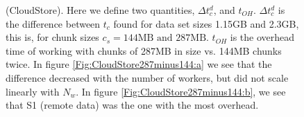 \documentclass{rspublic}
\begin{document}
\begin{figure}
\begin{center}
\caption{(CloudStore). Here
we define two quantities, $\Delta t_c^d$, and $t_{OH}$. $\Delta t_c^d$
is the difference between $t_c$ found for data set sizes 1.15GB and
2.3GB, this is, for chunk sizes $c_s = 144\mbox{MB and } 287\mbox{MB}$.
$t_{OH}$ is the overhead time of working with chunks of 287MB in size
vs. 144MB chunks twice. In figure \ref{Fig:CloudStore287minus144:a} we
see that the difference decreased with the number of workers, but did
not scale linearly with $N_w$. In figure
\ref{Fig:CloudStore287minus144:b}, we see that S1 (remote data)
was the one with the most overhead.}
\label{Fig:CloudStore287minus144}
\end{center}
\vspace{-0.4cm}
\end{figure}
\end{document}

